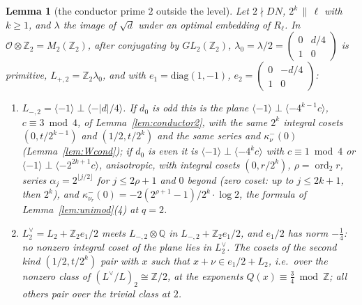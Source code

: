 \documentclass[11pt,reqno]{amsart}
\theoremstyle{plain}
\newtheorem{lemma}[theorem]{Lemma}
\theoremstyle{definition}
\DeclareMathOperator{\ord}{ord}
\newcommand{\Q}{\mathbb{Q}}
\newcommand{\Z}{\mathbb{Z}}
\newcommand{\Ldual}{L^{\vee}}
\begin{document}
\begin{lemma}[the conductor prime $2$ outside the level]\label{lem:unimod2}
Let $2\nmid DN$, $2^k\,\|\,\ell$ with $k\ge1$, and $\lambda$ the image of $\sqrt d$ under an optimal
embedding of $R_\ell$. In $\mathcal O\otimes\Z_2=M_2(\Z_2)$, after conjugating by $GL_2(\Z_2)$,
$\lambda_0=\lambda/2=\begin{pmatrix}0&d/4\\1&0\end{pmatrix}$ is primitive, $L_{+,2}=\Z_2\lambda_0$,
and with $e_1=\mathrm{diag}(1,-1)$, $e_2=\begin{pmatrix}0&-d/4\\1&0\end{pmatrix}$:
\begin{enumerate}
\item $L_{-,2}=\langle-1\rangle\perp\langle-\lvert d\rvert/4\rangle$. If $d_0$ is odd this is
      the plane $\langle-1\rangle\perp\langle-4^{k-1}c\rangle$, $c\equiv3\bmod4$, of
      Lemma~\ref{lem:conductor2}, with the same $2^k$ integral cosets $(0,t/2^{k-1})$ and
      $(1/2,t/2^k)$ and the same series and $\kappa^-_\nu(0)$ (Lemma~\ref{lem:Wcond}); if $d_0$ is
      even it is $\langle-1\rangle\perp\langle-4^kc\rangle$ with $c\equiv1\bmod4$ or $\langle-1
      \rangle\perp\langle-2^{2k+1}c\rangle$, anisotropic, with integral cosets $(0,r/2^k)$,
      $\rho=\ord_2r$, series $\alpha_j=2^{\lfloor j/2\rfloor}$ for $j\le2\rho+1$ and $0$ beyond
      (zero coset: up to $j\le2k+1$, then $2^k$), and
      $\kappa^-_{\nu_r}(0)=-2(2^{\rho+1}-1)/2^k\cdot\log2$, the formula of Lemma~\ref{lem:unimod}(4)
      at $q=2$.
\item $L_2^\vee=L_2+\Z_2e_1/2$ meets $L_{-,2}\otimes\Q$ in $L_{-,2}+\Z_2e_1/2$, and $e_1/2$ has
      norm $-\tfrac14$: no nonzero integral coset of the plane lies in $L_2^\vee$. The cosets of the
      second kind $(1/2,t/2^k)$ pair with $x$ such that $x+\nu\in e_1/2+L_2$, i.e.\ over the
      nonzero class of $(\Ldual/L)_2\cong\Z/2$, at the exponents $Q(x)\equiv\tfrac34\bmod\Z$; all
      others pair over the trivial class at $2$.
\end{enumerate}
\end{lemma}
\end{document}
